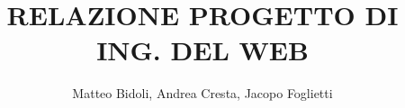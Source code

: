 \documentclass[12pt,a4paper,oneside]{article}
\title{RELAZIONE PROGETTO DI ING. DEL WEB}
\author{Matteo Bidoli, Andrea Cresta, Jacopo Foglietti}
\begin{document}
\maketitle
\pagebreak

\tableofcontents

\pagebreak
\begin{flushleft}

\pagebreak

\pagebreak

\pagebreak

\pagebreak

\pagebreak

\pagebreak

\pagebreak
\listoffigures

\end{flushleft}
\end{document}
